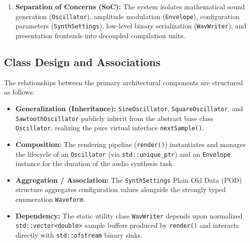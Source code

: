\documentclass[12pt,a4paper,oneside]{book}
\begin{document}
\begin{enumerate}
\begin{lstlisting}[language=C++, caption={Concrete Derived Waveform Implementations (\texttt{src/Waveforms.cpp})}, label={lst:waveforms_cpp}]
#include "Waveforms.h"
#include <cmath>

namespace {
constexpr double kTwoPi = 6.283185307179586476925286766559;
}

double SineOscillator::nextSample() {
    const double sample = std::sin(kTwoPi * phase_);
    advancePhase();
    return sample;
}

double SquareOscillator::nextSample() {
    const double sample = (phase_ < 0.5) ? 1.0 : -1.0;
    advancePhase();
    return sample;
}

double SawtoothOscillator::nextSample() {
    const double sample = 2.0 * phase_ - 1.0;
    advancePhase();
    return sample;
}
\end{lstlisting}

    \item \textbf{Separation of Concerns (SoC):} 
    The system isolates mathematical sound generation (\texttt{Oscillator}), amplitude modulation (\texttt{Envelope}), configuration parameters (\texttt{SynthSettings}), low-level binary serialization (\texttt{WavWriter}), and presentation frontends into decoupled compilation units.
\end{enumerate}

\subsection{Class Design and Associations}
The relationships between the primary architectural components are structured as follows:
\begin{itemize}
    \item \textbf{Generalization (Inheritance):} \texttt{SineOscillator}, \texttt{SquareOscillator}, and \texttt{SawtoothOscillator} publicly inherit from the abstract base class \texttt{Oscillator}, realizing the pure virtual interface \texttt{nextSample()}.
    \item \textbf{Composition:} The rendering pipeline (\texttt{render()}) instantiates and manages the lifecycle of an \texttt{Oscillator} (via \texttt{std::unique\_ptr}) and an \texttt{Envelope} instance for the duration of the audio synthesis task.
    \item \textbf{Aggregation / Association:} The \texttt{SynthSettings} Plain Old Data (POD) structure aggregates configuration values alongside the strongly typed enumeration \texttt{Waveform}.
    \item \textbf{Dependency:} The static utility class \texttt{WavWriter} depends upon normalized \texttt{std::vector<double>} sample buffers produced by \texttt{render()} and interacts directly with \texttt{std::ofstream} binary sinks.
\end{itemize}
\end{document}
